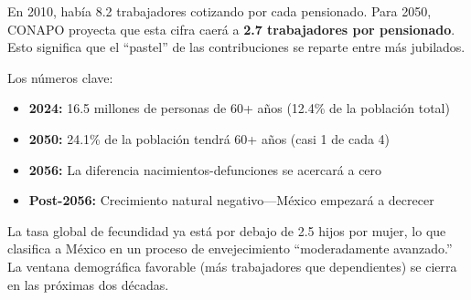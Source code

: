 \documentclass[11pt,a4paper]{report}
\begin{document}
\begin{tcolorbox}[colback=green!5!white, colframe=green!50!black, title=\textbf{Intuici\'on: M\'exico Envejece R\'apido}]
En 2010, hab\'ia 8.2 trabajadores cotizando por cada pensionado. Para 2050, CONAPO proyecta que esta cifra caer\'a a \textbf{2.7 trabajadores por pensionado}. Esto significa que el ``pastel'' de las contribuciones se reparte entre m\'as jubilados.

Los n\'umeros clave:
\begin{itemize}
  \item \textbf{2024:} 16.5 millones de personas de 60+ a\~nos (12.4\% de la poblaci\'on total)
  \item \textbf{2050:} 24.1\% de la poblaci\'on tendr\'a 60+ a\~nos (casi 1 de cada 4)
  \item \textbf{2056:} La diferencia nacimientos-defunciones se acercar\'a a cero
  \item \textbf{Post-2056:} Crecimiento natural negativo---M\'exico empezar\'a a decrecer
\end{itemize}

La tasa global de fecundidad ya est\'a por debajo de 2.5 hijos por mujer, lo que clasifica a M\'exico en un proceso de envejecimiento ``moderadamente avanzado.'' La ventana demogr\'afica favorable (m\'as trabajadores que dependientes) se cierra en las pr\'oximas dos d\'ecadas.
\end{tcolorbox}
\end{document}
